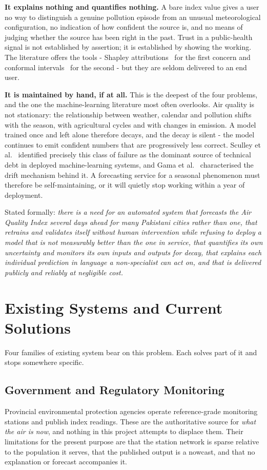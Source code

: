 \textbf{It explains nothing and quantifies nothing.} A bare index value gives a
user no way to distinguish a genuine pollution episode from an unusual
meteorological configuration, no indication of how confident the source is, and
no means of judging whether the source has been right in the past. Trust in a
public-health signal is not established by assertion; it is established by
showing the working. The literature offers the tools - Shapley
attributions~\cite{ref:shap,ref:treeshap} for the first concern and conformal
intervals~\cite{ref:leiconformal} for the second - but they are seldom delivered
to an end user.

\textbf{It is maintained by hand, if at all.} This is the deepest of the four
problems, and the one the machine-learning literature most often overlooks. Air
quality is not stationary: the relationship between weather, calendar and
pollution shifts with the season, with agricultural cycles and with changes in
emission. A model trained once and left alone therefore decays, and the decay is
silent - the model continues to emit confident numbers that are progressively
less correct. Sculley et al.~\cite{ref:techdebt} identified precisely this class
of failure as the dominant source of technical debt in deployed machine-learning
systems, and Gama et al.~\cite{ref:driftsurvey} characterised the drift mechanism
behind it. A forecasting service for a seasonal phenomenon must therefore be
self-maintaining, or it will quietly stop working within a year of deployment.

Stated formally: \emph{there is a need for an automated system that forecasts the
Air Quality Index several days ahead for many Pakistani cities rather than one,
that retrains and validates itself without human intervention while refusing to
deploy a model that is not measurably better than the one in service, that
quantifies its own uncertainty and monitors its own inputs and outputs for decay,
that explains each individual prediction in language a non-specialist can act on,
and that is delivered publicly and reliably at negligible cost.}

\section{Existing Systems and Current Solutions}
Four families of existing system bear on this problem. Each solves part of it and
stops somewhere specific.

\subsection{Government and Regulatory Monitoring}
Provincial environmental protection agencies operate reference-grade monitoring
stations and publish index readings. These are the authoritative source for
\emph{what the air is now}, and nothing in this project attempts to displace them.
Their limitations for the present purpose are that the station network is sparse
relative to the population it serves, that the published output is a nowcast, and
that no explanation or forecast accompanies it.

